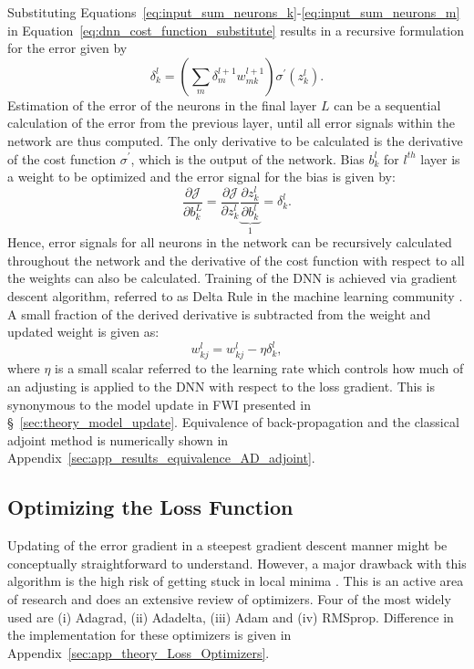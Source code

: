 Substituting Equations~\ref{eq:input_sum_neurons_k}-\ref{eq:input_sum_neurons_m} in Equation~\ref{eq:dnn_cost_function_substitute} results in a recursive formulation for the error given by 
\begin{equation}\label{eq:mlp_error}
	\delta_k^l=\left(\sum_{m}\delta_m^{l+1}w_{mk}^{l+1} \right)\sigma^{'}(z_k^l).
\end{equation}
Estimation of the error of the neurons in the final layer $L$ can be a sequential calculation of the error from the previous layer, until all error signals within the network are thus computed. The only derivative to be calculated is the derivative of the cost function $\sigma^{'}$, which is the output of the network. Bias $b_k^l$ for $l^{th}$ layer is a weight to be optimized and the error signal for the bias is given by:
\begin{equation}
	\frac{\partial\mathcal{J}}{\partial b_k^L}=\frac{\partial\mathcal{J}}{\partial z_k^l}\underbrace{\frac{\partial z_k^l}{\partial b_k^l}}_{1} = \delta_k^l.
\end{equation}
Hence, error signals for all neurons in the network can be recursively calculated throughout the network and the derivative of the cost function with respect to all the weights can also be calculated. Training of the DNN is achieved via gradient descent algorithm, referred to as Delta Rule in the machine learning community \citep{Sutton1988}. A small fraction of the derived derivative is subtracted from the weight and updated weight is given as:
\begin{equation}
	w_{kj}^l = w_{kj}^l-\eta\delta_k^l,
\end{equation}
where $\eta$ is a small scalar referred to the learning rate which controls how much of an adjusting is applied to the DNN with respect to the loss gradient. This is synonymous to the model update in FWI presented in §~\ref{sec:theory_model_update}. Equivalence of back-propagation and the classical adjoint method is numerically shown in Appendix~\ref{sec:app_results_equivalence_AD_adjoint}.

\subsection{Optimizing the Loss Function}\label{sec:theory_optimizing_the_loss_function}
Updating of the error gradient in a steepest gradient descent manner might be conceptually straightforward to understand. However, a major drawback with this algorithm is the high risk of getting stuck in local minima \citep{Fletcher1987}. This is an active area of research and \cite{Ruder2016} does an extensive review of optimizers. Four of the most widely used are (i) Adagrad, (ii) Adadelta, (iii) Adam and (iv) RMSprop. Difference in the implementation for these optimizers is given in Appendix~\ref{sec:app_theory_Loss_Optimizers}.

